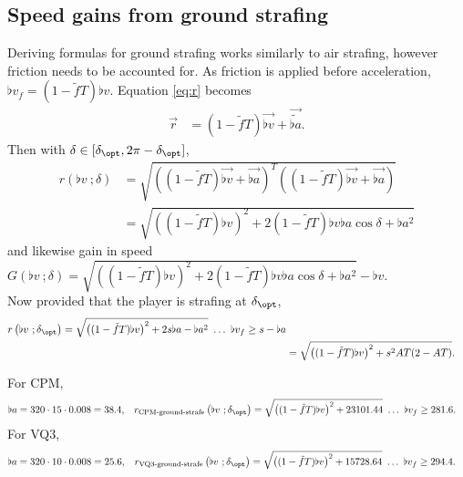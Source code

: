 \subsection{Speed gains from ground strafing}
\label{sec:accel_ground}
Deriving formulas for ground strafing works similarly to air strafing, however friction needs to be accounted for.
As friction is applied before acceleration, $\flat{v}_f = (1 - \tilde{f}T)\flat{v}$. Equation \eqref{eq:r} becomes %
\begin{align*}
\vec{r} &= (1 - \tilde{f}T)\vec{\flat{v}} + \vec{\tilde{\flat{a}}}.
\end{align*}
Then with $\delta \in [\delta_{\opt}, 2\pi - \delta_{\opt}]$,
\begin{align*}
r\left(\flat{v}\ ;\delta \right) &= \sqrt{\left((1 - \tilde{f}T)\vec{\flat{v}} + \vec{\flat{a}} \right)^T \left((1 - \tilde{f}T)\vec{\flat{v}} + \vec{\flat{a}} \right)}\\
&= \sqrt{\left((1 - \tilde{f}T)\flat{v} \right)^2 + 2(1 - \tilde{f}T)\flat{v}\flat{a}\cos\delta + \flat{a}^2}
\end{align*}
and likewise gain in speed $G\left(\flat{v}\ ;\delta \right) = \sqrt{\left((1 - \tilde{f}T)\flat{v} \right)^2 + 2(1 - \tilde{f}T)\flat{v}\flat{a}\cos\delta + \flat{a}^2} - \flat{v}$.\\

Now provided that the player is strafing at $\delta_{\opt}$,
\begin{align}
\label{eq:accel_opt_ground}
r\left(\flat{v}\ ;\delta_{\opt} \right) = \sqrt{\left((1 - \tilde{f}T)\flat{v} \right)^2 + 2s\flat{a} - \flat{a}^2}\ \ldots\ \flat{v}_f\ge s - \flat{a}\\\nonumber
&= \sqrt{\left((1 - \tilde{f}T)\flat{v} \right)^2 + s^2 AT(2 - AT)}.
\end{align}

For CPM,
\begin{align*}
\flat{a} = 320\cdot 15\cdot 0.008 = 38.4, && r_{\text{CPM-ground-strafe}}\left(\flat{v}\ ;\delta_{\opt} \right) &= \sqrt{\left((1 - \tilde{f}T)\flat{v} \right)^2 + 23101.44}\ \ldots\ \flat{v}_f\ge 281.6.
\end{align*}
For VQ3,
\begin{align*}
\flat{a} = 320\cdot 10\cdot 0.008 = 25.6, && r_{\text{VQ3-ground-strafe}}\left(\flat{v}\ ;\delta_{\opt} \right) &= \sqrt{\left((1 - \tilde{f}T)\flat{v} \right)^2 + 15728.64}\ \ldots\ \flat{v}_f\ge 294.4.
\end{align*}

